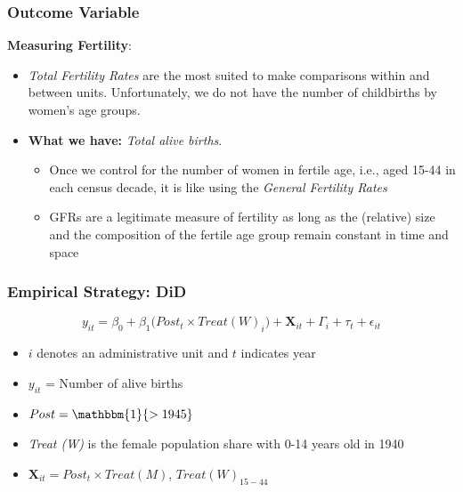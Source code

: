 \documentclass[aspectratio=169]{beamer}
\begin{document}
\begin{frame}
\frametitle{Outcome Variable}
\label{empirical}
\textbf{Measuring Fertility}:
\medskip
\begin{itemize}
    \item \textit{Total Fertility Rates} are the most suited to make comparisons within and between units. Unfortunately, we do not have the number of childbirths by women's age groups. 
    \medskip
    \item \textbf{What we have:} \textit{Total alive births}. 
    \begin{itemize}

\medskip 
    \item Once we control for the number of women in fertile age, i.e., aged 15-44 in each census decade, it is like using the \textit{General Fertility Rates}  
    \medskip
    \item GFRs are a legitimate measure of fertility as long as the  (relative) size and the composition of the fertile age group remain constant in time and space \hyperlink{stability_age}{}

    \end{itemize}

    \medskip
    
\end{itemize}

\end{frame} 
\begin{frame}[label=empirical_reg]
\frametitle{Empirical Strategy: DiD}
 
 \begin{equation}\label{main_eq}
y_{it} =\beta_0+  \beta_1   \big( \textit{Post}_t \times Treat (W)_i \big)+\mathbf{X}_{it}+\Gamma_i+ \tau_{t}+\epsilon_{it}
\end{equation}
\smallskip
\begin{itemize}
\item  $i$  denotes an administrative unit and $t$  indicates year
\medskip
\item $y_{it}$ = Number of alive births 
\medskip
\item $Post= \mathbbm{1} \{> 1945\}$ 
\medskip

\item \textit{Treat (W)} is the female population share with 0-14 years old in 1940
\medskip


\item $\mathbf{X}_{it} = Post_t \times  Treat (M)$, $Treat (W)_{15-44}$

\end{itemize}

\medskip

\hyperlink{map_together}{} \hyperlink{balancing}{} \hyperlink{descriptives}{} 

 
\end{frame}
\end{document}

